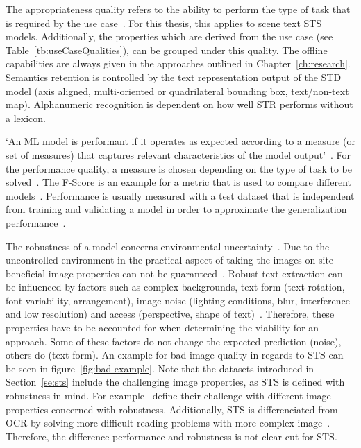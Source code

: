 The appropriateness quality refers to the ability to perform the type of task that is required by
the use case~\citep{siebert_construction_2021,nakamichi_requirements-driven_2020}.
For this thesis, this applies to scene text \ac{STS} models.
Additionally, the properties which are derived from the use case (see
Table~\ref{tb:useCaseQualities}), can be grouped under this quality.
The offline capabilities are always given in the approaches outlined in Chapter~\ref{ch:research}.
Semantics retention is controlled by the text representation output of the \ac{STD} model (axis aligned,
multi-oriented or quadrilateral bounding box, text/non-text map).
Alphanumeric recognition is dependent on how well \ac{STR} performs without a lexicon.

`An ML model is performant if it operates as expected according to a measure (or set of measures)
that captures relevant characteristics of the model output'~\citep{ashmore_assuring_2021}.
For the performance quality, a measure is chosen depending on the type of task to be
solved~\citep{siebert_construction_2021}.
The F-Score is an example for a metric that is used to compare different
models~\cite{chen_text_2021, long_scene_2021}.
Performance is usually measured with a test dataset that is independent from training and validating
a model in order to approximate the generalization performance~\citep{goodfellow_deep_2016,
nakamichi_requirements-driven_2020}.

The robustness of a model concerns environmental uncertainty~\citep{ashmore_assuring_2021}.
Due to the uncontrolled environment in the practical aspect of taking the images on-site
beneficial image properties can not be guaranteed~\citep{chen_text_2021}.
Robust text extraction can be influenced by factors such as complex backgrounds, text form
(text rotation, font variability, arrangement), image noise (lighting conditions, blur,
interference and low resolution) and access (perspective, shape of
text)~\citep{oyedotun_deep_2015,ghosh_visual_2017,chen_text_2021}.
Therefore, these properties have to be accounted for when determining the viability for an approach.
Some of these factors do not change the expected prediction (noise), others do (text
form)\cite{hu_towards_2020}.
An example for bad image quality in regards to \ac{STS} can be seen in figure~\ref{fig:bad-example}.
Note that the datasets introduced in Section~\ref{se:sts} include the challenging image properties,
as \ac{STS} is defined with robustness in mind.
For example~\cite{karatzas_icdar_2013,karatzas_icdar_2015,chng_total-text_2017} define their
challenge with different image properties concerned with robustness.
Additionally, \ac{STS} is differenciated from \ac{OCR} by solving more difficult reading problems
with more complex image~\citep{long_scene_2021,hu_gtc_2020,chen_text_2021,baek_what_2019}.
Therefore, the difference performance and robustness is not clear cut for \ac{STS}.

